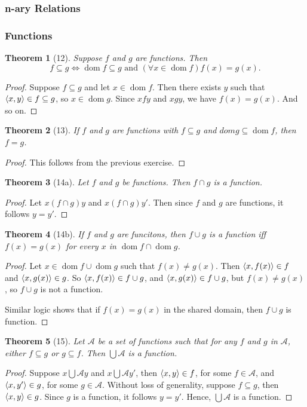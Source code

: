 \documentclass[12pt]{article}
\theoremstyle{plain}
\newtheorem*{exthm}{Theorem}
\theoremstyle{remark}
\theoremstyle{definition}
\theoremstyle{remark}
\DeclarePairedDelimiter{\ang}{\langle}{\rangle}
\renewcommand{\iff}{\Leftrightarrow}
\DeclareMathOperator{\dom}{dom}
\begin{document}
\subsubsection{n-ary Relations}
\subsubsection{Functions}

\begin{exthm}[12]
  Suppose $f$ and $g$ are functions. Then
  \[
    f \subseteq g \iff \dom{f} \subseteq g \text{ and  } (\forall x \in \dom{f}) f(x) = g(x).
  \]
\end{exthm}
\begin{proof}
  Suppose $f \subseteq g$ and let $x \in \dom{f}$. Then there exists $y$ such that $\ang{x, y} \in f \subseteq g$, so $x \in \dom{g}$. Since $xfy$ and $xgy$, we have $f(x) = g(x)$. And so on.
\end{proof}

\begin{exthm}[13]
  If $f$ and $g$ are functions with $f \subseteq g$ and $dom g \subseteq \dom{f}$, then $f = g$.
\end{exthm}
\begin{proof}
  This follows from the previous exercise.
\end{proof}

\begin{exthm}[14a]
  Let $f$ and $g$ be functions. Then $f \cap g$ is a function.
\end{exthm}
\begin{proof}
  Let $x(f\cap g)y$ and $x(f \cap g)y'$. Then since $f$ and $g$ are functions, it follows $y = y'$.
\end{proof}

\begin{exthm}[14b]
  If $f$ and $g$ are funcitons, then $f \cup g$ is a function iff $f(x) = g(x)$ for every $x$ in $\dom{f} \cap \dom{g}$.
\end{exthm}
\begin{proof}
  Let $x \in \dom{f} \cup \dom{g}$ such that $f(x) \neq g(x)$. Then $\ang{x, f(x)} \in f$ and $\ang{x, g(x)} \in g$. So $\ang{x, f(x)} \in f \cup g$, and $\ang{x, g(x)} \in f \cup g$, but $f(x) \neq g(x)$, so $f \cup g$ is not a function.

  Similar logic shows that if $f(x) = g(x)$ in the shared domain, then $f \cup g$ is function.
\end{proof}

\begin{exthm}[15]
  Let $\mathscr{A}$ be a set of functions such that for any $f$ and $g$ in $\mathscr{A}$, either $f \subseteq g$ or $g \subseteq f$. Then $\bigcup \mathscr{A}$ is a function.
\end{exthm}
\begin{proof}
  Suppose $x \bigcup \mathscr{A} y$ and $x \bigcup \mathscr{A} y'$, then $\ang{x,y} \in f$, for some $f \in \mathscr{A}$, and $\ang{x, y'} \in g$, for some $g \in \mathscr{A}$. Without loss of generality, suppose $f \subseteq g$, then $\ang{x, y} \in g$. Since $g$ is a function, it follows $y = y'$. Hence, $\bigcup \mathscr{A}$ is a function.
\end{proof}
\end{document}
